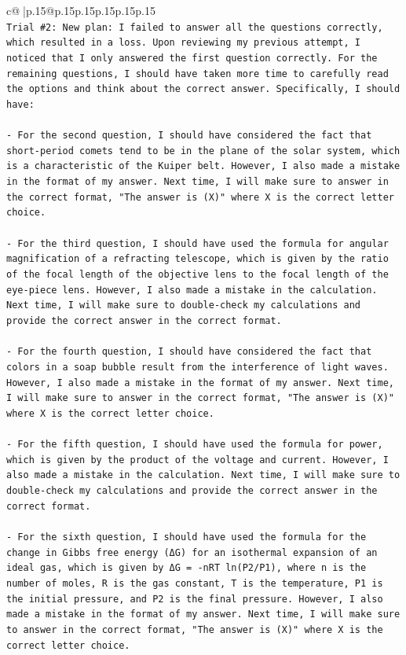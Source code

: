 \documentclass{article}
\begin{document}
{\begin{supertabular}{c@{$\;$}|p{.15\linewidth}@{}p{.15\linewidth}p{.15\linewidth}p{.15\linewidth}p{.15\linewidth}p{.15\linewidth}}
{{{\\ 
\texttt{Trial \#2: New plan: I failed to answer all the questions correctly, which resulted in a loss. Upon reviewing my previous attempt, I noticed that I only answered the first question correctly. For the remaining questions, I should have taken more time to carefully read the options and think about the correct answer. Specifically, I should have:} \\
\\ 
\texttt{{-} For the second question, I should have considered the fact that short{-}period comets tend to be in the plane of the solar system, which is a characteristic of the Kuiper belt. However, I also made a mistake in the format of my answer. Next time, I will make sure to answer in the correct format, "The answer is (X)" where X is the correct letter choice.} \\
\\ 
\texttt{{-} For the third question, I should have used the formula for angular magnification of a refracting telescope, which is given by the ratio of the focal length of the objective lens to the focal length of the eye{-}piece lens. However, I also made a mistake in the calculation. Next time, I will make sure to double{-}check my calculations and provide the correct answer in the correct format.} \\
\\ 
\texttt{{-} For the fourth question, I should have considered the fact that colors in a soap bubble result from the interference of light waves. However, I also made a mistake in the format of my answer. Next time, I will make sure to answer in the correct format, "The answer is (X)" where X is the correct letter choice.} \\
\\ 
\texttt{{-} For the fifth question, I should have used the formula for power, which is given by the product of the voltage and current. However, I also made a mistake in the calculation. Next time, I will make sure to double{-}check my calculations and provide the correct answer in the correct format.} \\
\\ 
\texttt{{-} For the sixth question, I should have used the formula for the change in Gibbs free energy (ΔG) for an isothermal expansion of an ideal gas, which is given by ΔG = {-}nRT ln(P2/P1), where n is the number of moles, R is the gas constant, T is the temperature, P1 is the initial pressure, and P2 is the final pressure. However, I also made a mistake in the format of my answer. Next time, I will make sure to answer in the correct format, "The answer is (X)" where X is the correct letter choice.} \\
}}}
\end{supertabular}}
\end{document}
